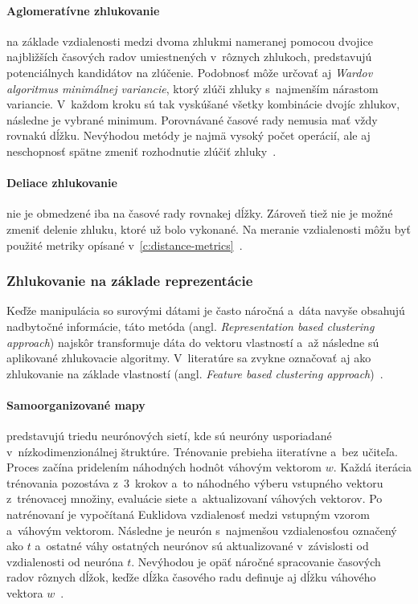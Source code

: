 \documentclass[a4paper,twoside,slovak,12pt,appendix]{article}
\begin{document}
\paragraph{Aglomeratívne zhlukovanie} na základe vzdialenosti medzi dvoma
zhlukmi nameranej pomocou dvojice najbližších časových radov umiestnených
v~rôznych zhlukoch, predstavujú potenciálnych kandidátov na zlúčenie. Podobnosť
môže určovať aj \textit{Wardov algoritmus minimálnej variancie}, ktorý zlúči
zhluky s~najmenším nárastom variancie. V~každom kroku sú tak vyskúšané všetky
kombinácie dvojíc zhlukov, následne je vybrané minimum. Porovnávané časové rady
nemusia mať vždy rovnakú dĺžku. Nevýhodou metódy je najmä vysoký počet operácií,
ale aj neschopnosť spätne zmeniť rozhodnutie zlúčiť
zhluky~\cite{WarrenLiao2005}.

\paragraph{Deliace zhlukovanie} nie je obmedzené iba na časové rady rovnakej
dĺžky. Zároveň tiež nie je možné zmeniť delenie zhluku, ktoré už bolo vykonané.
Na meranie vzdialenosti môžu byť použité metriky opísané
v~\ref{c:distance-metrics}~\cite{WarrenLiao2005}.

\subsubsection{Zhlukovanie na základe reprezentácie}
\label{c:feature-clustering}
Keďže manipulácia so surovými dátami je často náročná a~dáta navyše obsahujú
nadbytočné informácie, táto metóda (angl. \textit{Representation based
clustering approach}) najskôr transformuje dáta do vektoru vlastností a~až
následne sú aplikované zhlukovacie algoritmy. V~literatúre sa zvykne označovať
aj ako zhlukovanie na základe vlastností (angl. \textit{Feature based clustering
approach})~\cite{Rani2012}.

\paragraph{Samoorganizované mapy} predstavujú triedu neurónových sietí, kde
sú neuróny usporiadané v~nízkodimenzionálnej štruktúre. Trénovanie prebieha
iiteratívne a~bez učiteľa. Proces začína pridelením náhodných hodnôt váhovým
vektorom $w$. Každá iterácia trénovania pozostáva z~3~krokov a~to náhodného
výberu vstupného vektoru z~trénovacej množiny, evaluácie siete a~aktualizovaní
váhových vektorov. Po natrénovaní je vypočítaná Euklidova vzdialenosť medzi
vstupným vzorom a~váhovým vektorom. Následne je neurón s~najmenšou vzdialenosťou
označený ako $t$ a~ostatné váhy ostatných neurónov sú aktualizované v~závislosti
od vzdialenosti od neuróna $t$. Nevýhodou je opäť náročné spracovanie časových
radov rôznych dĺžok, keďže dĺžka časového radu definuje aj dĺžku váhového
vektora $w$~\cite{Kohonen2001,WarrenLiao2005}.
\end{document}

